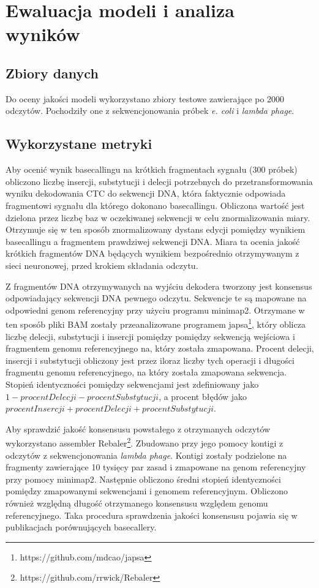 \documentclass[a4paper,11pt,twoside]{report}
\theoremstyle{definition}
\begin{document}
\chapter{Ewaluacja modeli i analiza wyników}

\section{Zbiory danych}

Do oceny jakości modeli wykorzystano zbiory testowe zawierające po 2000 odczytów. Pochodziły one z sekwencjonowania próbek \textit{e. coli} i \textit{lambda phage}\cite{chironData}.

\section{Wykorzystane metryki}

Aby ocenić wynik basecallingu na krótkich fragmentach sygnału (300 próbek) obliczono liczbę insercji, substytucji i delecji potrzebnych do przetransformowania wyniku dekodowania CTC do sekwencji DNA, która faktycznie odpowiada fragmentowi sygnału dla którego dokonano basecallingu. Obliczona wartość jest dzielona przez liczbę baz w oczekiwanej sekwencji w celu znormalizowania miary. Otrzymuje się w ten sposób znormalizowany dystans edycji pomiędzy wynikiem basecallingu a fragmentem prawdziwej sekwencji DNA. Miara ta ocenia jakość krótkich fragmentów DNA będących wynikiem bezpośrednio otrzymywanym z sieci neuronowej, przed krokiem składania odczytu.

Z fragmentów DNA otrzymywanych na wyjściu dekodera tworzony jest konsensus odpowiadający sekwencji DNA pewnego odczytu. Sekwencje te są mapowane na odpowiedni genom referencyjny przy użyciu programu minimap2\cite{minimap}. Otrzymane w ten sposób pliki BAM zostały przeanalizowane programem japsa\footnote{https://github.com/mdcao/japsa}, który oblicza liczbę delecji, substytucji i insercji pomiędzy pomiędzy sekwencją wejściowa i fragmentem genomu referencyjnego na, który została zmapowana. Procent delecji, insercji i substytucji obliczony jest przez iloraz liczby tych operacji i długości fragmentu genomu referencyjnego, na który została zmapowana sekwencja. Stopień identyczności pomiędzy sekwencjami jest zdefiniowany jako $1-procentDelecji-procentSubstytucji$, a procent błędów jako $procentInsercji + procentDelecji + procentSubstytucji$.

Aby sprawdzić jakość konsensusu powstałego z otrzymanych odczytów wykorzystano assembler Rebaler\footnote{https://github.com/rrwick/Rebaler}. Zbudowano przy jego pomocy kontigi z odczytów z sekwencjonowania \textit{lambda phage}. Kontigi zostały podzielone na fragmenty zawierające 10 tysięcy par zasad i zmapowane na genom referencyjny przy pomocy minimap2. Następnie obliczono średni stopień identyczności pomiędzy zmapowanymi sekwencjami i genomem referencyjnym. Obliczono również względną długość otrzymanego konsensusu względem genomu referencyjnego. Taka procedura sprawdzenia jakości konsensusu pojawia się w publikacjach porównujących basecallery\cite{wick}\cite{chiron}.
\end{document}
